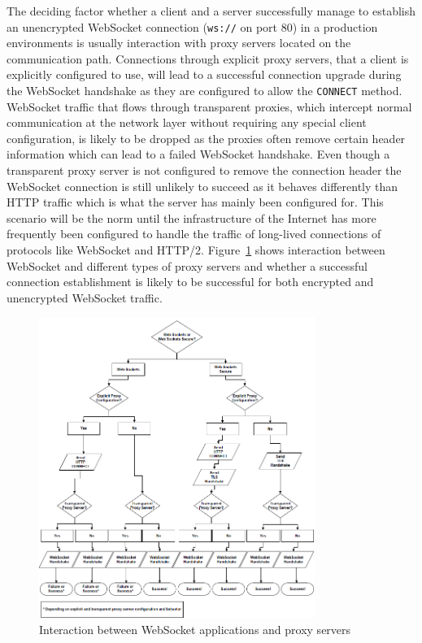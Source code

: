 The deciding factor whether a client and a server successfully manage to establish an unencrypted WebSocket connection (\texttt{ws://} on port 80) in a production environments is usually interaction with proxy servers located on the communication path. Connections through explicit proxy servers, that a client is explicitly configured to use, will lead to a successful connection upgrade during the WebSocket handshake as they are configured to allow the \texttt{CONNECT} method. WebSocket traffic that flows through transparent proxies, which intercept normal communication at the network layer without requiring any special client configuration, is likely to be dropped as the proxies often remove certain header information which can lead to a failed WebSocket handshake. Even though a transparent proxy server is not configured to remove the connection header the WebSocket connection is still unlikely to succeed as it behaves differently than HTTP traffic which is what the server has mainly been configured for. This scenario will be the norm until the infrastructure of the Internet has more frequently been configured to handle the traffic of long-lived connections of protocols like WebSocket and HTTP/2. Figure~\ref{fig:webSocketProxyServer} shows interaction between WebSocket and different types of proxy servers and whether a successful connection establishment is likely to be successful for both encrypted and unencrypted WebSocket traffic.
\\
\begin{figure}[h!]
	\centering
	\includegraphics[width=0.8\textwidth]{images/websocketProxyServer}
	\caption{Interaction between WebSocket applications and proxy servers \cite{wang2013definitive}}
	\label{fig:webSocketProxyServer}
\end{figure}

